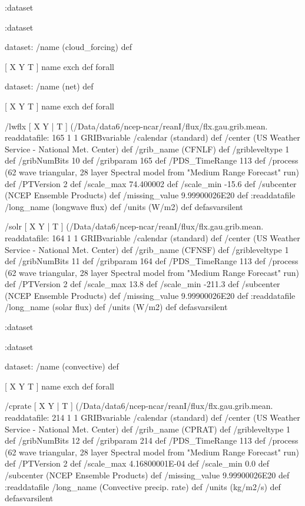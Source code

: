 \begin{ingrid}
   :dataset

  :dataset

  dataset: /name (cloud_forcing) def

   [ X Y T ] { name exch def } forall

   dataset: /name (net) def

    [ X Y T ] { name exch def } forall

    /lwflx { [ X Y | T ] (/Data/data6/ncep-ncar/reanI/flux/flx.gau.grib.mean.%
    readdatafile:
    165 1 1 GRIBvariable
    /calendar (standard) def
    /center (US Weather Service - National Met. Center) def
    /grib_name (CFNLF) def
    /gribleveltype 1 def
    /gribNumBits 10 def
    /gribparam 165 def
    /PDS_TimeRange 113 def
    /process (62 wave triangular, 28 layer Spectral model from "Medium Range Forecast" run) def
    /PTVersion 2 def
    /scale_max 74.400002 def
    /scale_min -15.6 def
    /subcenter (NCEP Ensemble Products) def
    /missing_value 9.99900026E20 def
    :readdatafile
    /long_name (longwave flux) def
    /units (W/m2) def
    } defasvarsilent

    /solr { [ X Y | T ] (/Data/data6/ncep-ncar/reanI/flux/flx.gau.grib.mean.%
    readdatafile:
    164 1 1 GRIBvariable
    /calendar (standard) def
    /center (US Weather Service - National Met. Center) def
    /grib_name (CFNSF) def
    /gribleveltype 1 def
    /gribNumBits 11 def
    /gribparam 164 def
    /PDS_TimeRange 113 def
    /process (62 wave triangular, 28 layer Spectral model from "Medium Range Forecast" run) def
    /PTVersion 2 def
    /scale_max 13.8 def
    /scale_min -211.3 def
    /subcenter (NCEP Ensemble Products) def
    /missing_value 9.99900026E20 def
    :readdatafile
    /long_name (solar flux) def
    /units (W/m2) def
    } defasvarsilent

   :dataset

  :dataset

  dataset: /name (convective) def

   [ X Y T ] { name exch def } forall

   /cprate { [ X Y | T ] (/Data/data6/ncep-ncar/reanI/flux/flx.gau.grib.mean.%
   readdatafile:
   214 1 1 GRIBvariable
   /calendar (standard) def
   /center (US Weather Service - National Met. Center) def
   /grib_name (CPRAT) def
   /gribleveltype 1 def
   /gribNumBits 12 def
   /gribparam 214 def
   /PDS_TimeRange 113 def
   /process (62 wave triangular, 28 layer Spectral model from "Medium Range Forecast" run) def
   /PTVersion 2 def
   /scale_max 4.16800001E-04 def
   /scale_min 0.0 def
   /subcenter (NCEP Ensemble Products) def
   /missing_value 9.99900026E20 def
   :readdatafile
   /long_name (Convective precip. rate) def
   /units (kg/m2/s) def
   } defasvarsilent


\end{ingrid}
